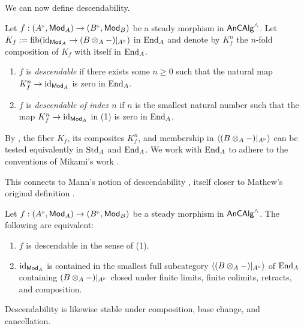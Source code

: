 We can now define descendability.
\begin{definition}\label{def: descendable morphisms}
    Let $f:(A^{\tri},\Mod_{A})\to (B^{\tri},\Mod_{B})$ be a steady morphism in $\mathsf{An}\mathsf{CAlg}^{\wedge}$. Let $K_{f}:=\fib(\id_{\Mod_{A}}\to (B\otimes_{A}-)|_{A^{\tri}})$ in $\mathrm{End}_{A}$ and denote by $K_{f}^{n}$ the $n$-fold composition of $K_{f}$ with itself in $\mathrm{End}_{A}$. 
    \begin{enumerate}
        \item $f$ is \emph{descendable} if there exists some $n\geq0$ such that the natural map $K_{f}^{n}\to \mathrm{id}_{\mathsf{Mod}_{A}}$ is zero in $\mathrm{End}_{A}$. 
        \item $f$ is \emph{descendable of index $n$} if $n$ is the smallest natural number such that the map $K_{f}^{n}\to \mathrm{id}_{\mathsf{Mod}_{A}}$ in (1) is zero in $\mathrm{End}_{A}$.
    \end{enumerate}
\end{definition}
\begin{remark}\label{rmk: formation of K in Std and End}
    By , the fiber $K_{f}$, its composites $K_{f}^{n}$, and membership in $\langle(B\otimes_{A}-)|_{A^{\tri}}\rangle$ can be tested equivalently in $\mathrm{Std}_{A}$ and $\mathrm{End}_{A}$. We work with $\mathrm{End}_{A}$ to adhere to the conventions of Mikami's work \cite[\S 4]{MikamiFPPF}. 
\end{remark}
This connects to Mann's notion of descendability \cite[Def. 2.6.1]{MannRigid6FF}, itself closer to Mathew's original definition \cite[\S 3]{MatthewGalois}.
\begin{lemma}\label{lem: descendable equivalent}
    Let $f:(A^{\tri},\Mod_{A})\to (B^{\tri},\Mod_{B})$ be a steady morphism in $\mathsf{An}\mathsf{CAlg}^{\wedge}$. The following are equivalent:
    \begin{enumerate}[label=(\alph*)]
        \item $f$ is descendable in the sense of  (1). 
        \item $\mathrm{id}_{\mathsf{Mod}_{A}}$ is contained in the smallest full subcategory $\langle (B\otimes_{A}-)|_{A^{\tri}}\rangle$ of $\mathrm{End}_{A}$ containing $(B\otimes_{A}-)|_{A^{\tri}}$ closed under finite limits, finite colimits, retracts, and composition. 
    \end{enumerate}
\end{lemma}
Descendability is likewise stable under composition, base change, and cancellation.
